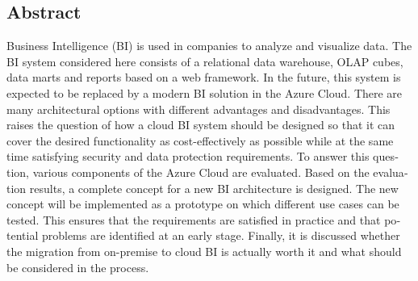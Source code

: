 

\begin{otherlanguage}{american}
	\chapter*{Abstract}
	Business Intelligence (BI) is used in companies to analyze and visualize data. The BI system considered here consists of a relational data warehouse, OLAP cubes, data marts and reports based on a web framework. In the future, this system is expected to be replaced by a modern BI solution in the Azure Cloud. There are many architectural options with different advantages and disadvantages. This raises the question of how a cloud BI system should be designed so that it can cover the desired functionality as cost-effectively as possible while at the same time satisfying security and data protection requirements. To answer this question, various components of the Azure Cloud are evaluated. Based on the evaluation results, a complete concept for a new BI architecture is designed. The new concept will be implemented as a prototype on which different use cases can be tested. This ensures that the requirements are satisfied in practice and that potential problems are identified at an early stage. Finally, it is discussed whether the migration from on-premise to cloud BI is actually worth it and what should be considered in the process.
\end{otherlanguage}
